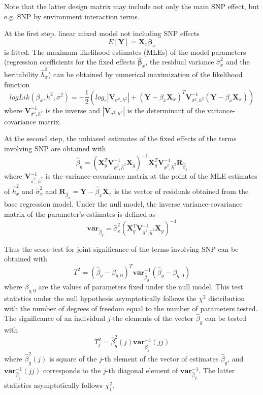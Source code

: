 \documentclass[12pt]{article}
\begin{document}
Note that the latter design matrix may include not only the main SNP effect, but 
e.g. SNP by environment interaction terms.

At the first step, linear mixed model not including SNP effects
$$
E[\mathbf{Y}] = \mathbf{X}_x \mathbf{\beta}_x
$$
is fitted. The maximum likelihood estimates (MLEs) of the model parameters (regression coefficients for 
the fixed effects $\hat{\mathbf{\beta}}_x$, the
residual variance $\hat{\sigma}^2_x$ and the heritability $\hat{h}^2_x$) can 
be obtained by numerical maximization of the likelihood function
$$
logLik(\beta_x,h^2,\sigma^2) = -\frac{1}{2} ( log_e|\mathbf{V}_{\sigma^2,h^2}|+
(\mathbf{Y} - \beta_x \mathbf{X}_x)^T \mathbf{V}_{\sigma^2,h^2}^{-1} (\mathbf{Y} - \beta_x \mathbf{X}_x) )
$$
where $\mathbf{V}_{\sigma^2,h^2}^{-1}$ is the inverse and 
$|\mathbf{V}_{\sigma^2,h^2}|$ is the determinant of the variance-covariance matrix. 

At the second step, the unbiased estimates of the fixed effects of the terms 
involving SNP are obtained with 
$$
\hat{\beta}_g = (\mathbf{X}^T_g \mathbf{V}^{-1}_{\hat{\sigma}^2,\hat{h}^2} \mathbf{X}_g)^{-1} 
		\mathbf{X}^T_g \mathbf{V}^{-1}_{\hat{\sigma}^2,\hat{h}^2} \mathbf{R}_{\hat{\beta}_x}
$$
where $\mathbf{V}^{-1}_{\hat{\sigma}^2,\hat{h}^2}$ is the variance-covariance matrix at the point 
of the MLE estimates of $\hat{h}^2_x$ and $\hat{\sigma}^2_x$ and 
$\mathbf{R}_{\hat{\beta}_x} = \mathbf{Y} - \hat{\beta}_x \mathbf{X}_x$ is the 
vector of residuals obtained from the base regression model. Under the null 
model, the inverse variance-covariance matrix of the parameter's estimates is defined 
as
$$
\mathbf{var}_{\hat{\beta}_g} = \hat{\sigma}^2_x (\mathbf{X}^T_g \mathbf{V}^{-1}_{\hat{\sigma}^2,\hat{h}^2} \mathbf{X}_g)^{-1}
$$

Thus the score test for joint significance of the terms involving SNP can be obtained with 
$$
T^2 = (\hat{\beta}_g - \beta_{g,0})^T \mathbf{var}_{\hat{\beta}_g}^{-1} (\hat{\beta}_g - \beta_{g,0})
$$
where $\beta_{g,0}$ are the values of parameters fixed under the null model. 
This test statistics under the null hypothesis asymptotically follows the 
$\chi^2$ distribution with the number of degrees 
of freedom equal to the number of parameters tested. 
The significance of an individual $j$-the elements of the vector $\hat{\beta}_g$ can be tested with
$$
T^2_j = \hat{\beta}_{g}^2(j) \mathbf{var}_{\hat{\beta}_g}^{-1}(jj)
$$
where $\hat{\beta}_{g}^2(j)$ is square of the $j$-th element of the vector of estimates $\hat{\beta}_{g}$, 
and $\mathbf{var}_{\hat{\beta}_g}^{-1}(jj)$ corresponds to the $j$-th diagonal element of 
$\mathbf{var}_{\hat{\beta}_g}^{-1}$.
The latter statistics asymptotically follows $\chi^2_1$.
\end{document}
